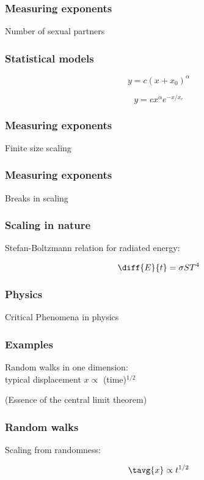 \begin{frame}
  \frametitle{Measuring exponents}

  Number of sexual partners


\end{frame}

\begin{frame}
  \frametitle{Statistical models}

  $$y = c (x + x_0)^\alpha$$

  $$y = c x^\alpha e^{-x/x_c}$$

\end{frame}

\begin{frame}
  \frametitle{Measuring exponents}

  Finite size scaling

\end{frame}

\begin{frame}
  \frametitle{Measuring exponents}

  Breaks in scaling


\end{frame}

\begin{frame}
  \frametitle{Scaling in nature}

  Stefan-Boltzmann relation for radiated energy:

  $$\diff{E}{t} = \sigma S T^4$$


\end{frame}

\begin{frame}
  \frametitle{Physics}

  Critical Phenomena in physics


\end{frame}

\begin{frame}
  \frametitle{Examples}

  Random walks in one dimension:\\
  typical displacement $x \propto$ (time)$^{1/2}$


  (Essence of the central limit theorem)



\end{frame}

\begin{frame}
  \frametitle{Random walks}

  Scaling from randomness:



  $$\tavg{x} \propto t^{1/2}$$


\end{frame}

